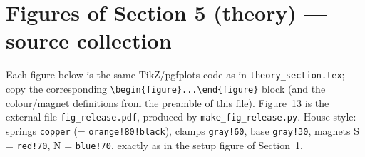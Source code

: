 \documentclass[11pt,a4paper]{article}
\begin{document}
\section*{Figures of Section 5 (theory) --- source collection}
\noindent Each figure below is the same TikZ/pgfplots code as in \texttt{theory\_section.tex}; copy the corresponding \verb|\begin{figure}...\end{figure}| block (and the colour/magnet definitions from the preamble of this file). Figure~13 is the external file \texttt{fig\_release.pdf}, produced by \texttt{make\_fig\_release.py}. House style: springs \texttt{copper} (= \texttt{orange!80!black}), clamps \texttt{gray!60}, base \texttt{gray!30}, magnets S = \texttt{red!70}, N = \texttt{blue!70}, exactly as in the setup figure of Section~1.
\bigskip
\end{document}
